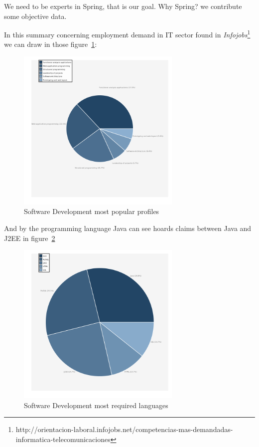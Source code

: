\documentclass[11pt]{scrartcl}
\begin{document}
\par We need to be experts in Spring, that is our goal. Why Spring? we contribute some objective data.

\par In this summary concerning employment demand in IT sector found in \emph{Infojobs}\footnote{http://orientacion-laboral.infojobs.net/competencias-mas-demandadas-informatica-telecomunicaciones} we can draw in those figure~\ref{fig:req-profiles}:

\begin{figure}[H]
\begin{center}
  \includegraphics[width=0.7\textwidth]{images/requested-profiles-piechart.png}
  \caption{Software Development most popular profiles}
  \label{fig:req-profiles}
\end{center}
\end{figure}

\par And by the programming language Java can see hoards claims between Java and J2EE in figure~\ref{fig:req-languages}

\begin{figure}[H]
\begin{center}
  \includegraphics[width=0.7\textwidth]{images/requested-programming-language-piechart.png}
  \caption{Software Development most required languages}
  \label{fig:req-languages}
\end{center}
\end{figure}
\end{document}
